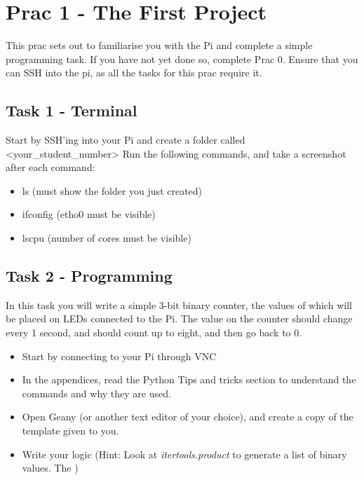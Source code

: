 \section{Prac 1 - The First Project}
This prac sets out to familiarise you with the Pi and complete a simple programming task. If you have not yet done so, complete Prac 0. Ensure that you can SSH into the pi, as all the tasks for this prac require it.

\subsection{Task 1 - Terminal}
Start by SSH'ing into your Pi and create a folder called <your\_student\_number>
Run the following commands, and take a screenshot after each command:
\begin{itemize}
    \item ls (must show the folder you just created)
    \item ifconfig (etho0 must be visible)
    \item lscpu (number of cores must be visible)
\end{itemize}

\subsection{Task 2 - Programming}
In this task you will write a simple 3-bit binary counter, the values of which will be placed on LEDs connected to the Pi. The value on the counter should change every 1 second, and should count up to eight, and then go back to 0.
\begin{itemize}
    \item Start by connecting to your Pi through VNC
    \item In the appendices, read the Python Tips and tricks section to understand the commands and why they are used.
    \item Open Geany (or another text editor of your choice), and create a copy of the template given to you. 
    \item Write your logic (Hint: Look at \textit{itertools.product} to generate a list of binary values. The )
\end{itemize}

